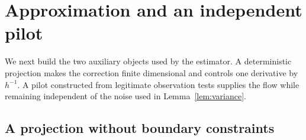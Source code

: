 \documentclass[11pt]{article}
\theoremstyle{remark}
\begin{document}
\section{Approximation and an independent pilot}\label{sec:construction}
We next build the two auxiliary objects used by the estimator. A deterministic projection makes the correction finite dimensional and controls one derivative by $h^{-1}$. A pilot constructed from legitimate observation tests supplies the flow while remaining independent of the noise used in Lemma~\ref{lem:variance}.

\subsection{A projection without boundary constraints}
\end{document}
